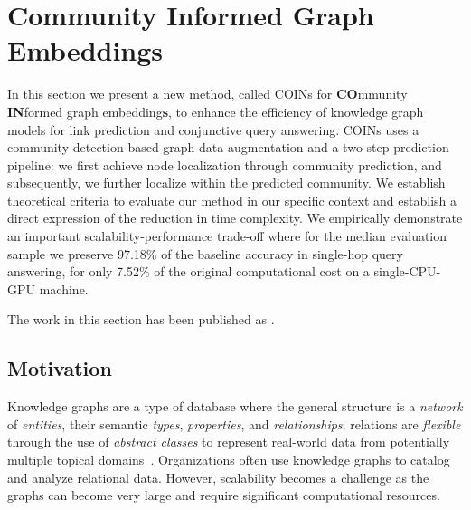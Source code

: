 \section{Community Informed Graph Embeddings}
\label{sec: coins}


In this section we present a new method, called COINs for \textbf{CO}mmunity \textbf{IN}formed graph embedding\textbf{s}, to enhance the efficiency of knowledge graph models for link prediction and conjunctive query answering. COINs uses a community-detection-based graph data augmentation and a two-step prediction pipeline: we first achieve node localization through community prediction, and subsequently, we further localize within the predicted community. We establish theoretical criteria to evaluate our method in our specific context and establish a direct expression of the reduction in time complexity. We empirically demonstrate an important scalability-performance trade-off where for the median evaluation sample we preserve 97.18\% of the baseline accuracy in single-hop query answering, for only 7.52\% of the original computational cost on a single-CPU-GPU machine. 

The work in this section has been published as .

\subsection{Motivation}
Knowledge graphs are a type of database where the general structure is a \emph{network} of \emph{entities}, their semantic \emph{types}, \emph{properties}, and \emph{relationships}; relations are \emph{flexible} through the use of \emph{abstract classes} to represent real-world data from potentially multiple topical domains~\cite{ehrlinger_towards_2016,hogan_knowledge_2020}. Organizations often use knowledge graphs to catalog and analyze relational data. However, scalability becomes a challenge as the graphs can become very large and require significant computational resources. %

